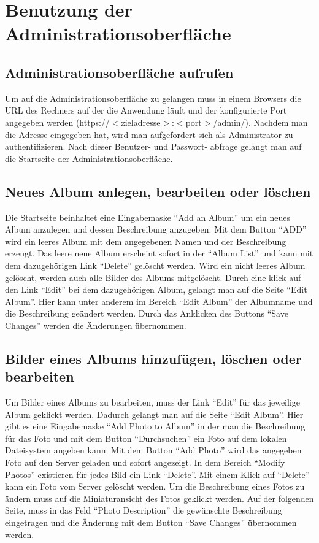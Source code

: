 \documentclass[a4paper,12pt,liststotocnumbered]{scrartcl}
\begin{document}
\newpage

\section{Benutzung der Administrationsoberfläche}

\subsection{Administrationsoberfläche aufrufen}

Um auf die Administrationsoberfläche zu gelangen muss in einem Browsers
die URL des Rechners auf der die Anwendung läuft und der konfigurierte
Port angegeben werden (https://$<$zieladresse$>$:$<$port$>$/admin/).
Nachdem man die Adresse eingegeben hat, wird man aufgefordert sich als
Administrator zu authentifizieren. Nach dieser Benutzer- und Passwort-
abfrage gelangt man auf die Startseite der Administrationsoberfläche.

\subsection{Neues Album anlegen, bearbeiten oder löschen}

Die Startseite beinhaltet eine Eingabemaske "`Add an Album"' um ein
neues Album anzulegen und dessen Beschreibung anzugeben. Mit dem Button
"`ADD"' wird ein leeres Album mit dem angegebenen Namen und der
Beschreibung erzeugt. Das leere neue Album erscheint sofort in der
"`Album List"' und kann mit dem dazugehörigen Link "`Delete"' gelöscht
werden. Wird ein nicht leeres Album gelöscht, werden auch alle Bilder
des Albums mitgelöscht. Durch eine klick auf den Link "`Edit"' bei dem
dazugehörigen Album, gelangt man auf die Seite "`Edit Album"'. Hier kann
unter anderem im Bereich "`Edit Album"' der Albumname und die
Beschreibung geändert werden. Durch das Anklicken des Buttons "`Save
Changes"' werden die Änderungen übernommen.

\subsection{Bilder eines Albums hinzufügen, löschen oder bearbeiten}

Um Bilder eines Albums zu bearbeiten, muss der Link "`Edit"' für das
jeweilige Album geklickt werden. Dadurch gelangt man auf die Seite
"`Edit Album"'. Hier gibt es eine Eingabemaske "`Add Photo to Album"' in
der man die Beschreibung für das Foto und mit dem Button "`Durchsuchen"'
ein Foto auf dem lokalen Dateisystem angeben kann. Mit dem Button "`Add
Photo"' wird das angegeben Foto auf den Server geladen und sofort
angezeigt.  In dem Bereich "`Modify Photos"' existieren für jedes Bild
ein Link "`Delete"'. Mit einem Klick auf "`Delete"' kann ein Foto vom
Server gelöscht werden.  Um die Beschreibung eines Fotos zu ändern muss
auf die Miniaturansicht des Fotos geklickt werden. Auf der folgenden
Seite, muss in das Feld "`Photo Description"' die gewünschte
Beschreibung eingetragen und die Änderung mit dem Button "`Save
Changes"' übernommen werden.
\end{document}
